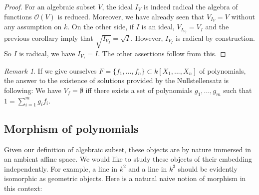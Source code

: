 \documentclass[12pt,a4paper,english]{article}
\theoremstyle{plain}
\theoremstyle{definition}
\theoremstyle{remark}
\newtheorem*{rem}{Remark}
\begin{document}
\begin{proof}
For an algebraic subset $V$, the ideal $I_{V}$ is indeed radical the algebra of functions $\mathcal{O}(V)$ is reduced. Moreover, we have already seen that $V_{I_{V}}=V$ without any assumption on $k$. On the other side, if $I$ is an ideal, $V_{I_{V_{I}}}=V_{I}$ and the previous corollary imply that $\sqrt{I_{V_{I}}}=\sqrt{I}$. However, $I_{V_{I}}$ is radical by construction. So $I$ is radical, we have $I_{V_{I}}=I$. The other assertions follow from this.  
\end{proof}
\begin{rem}
If we give ourselves $F=\{f_{1},...,f_{n}\}\subset k[X_{1},...,X_{n}]$ of polynomials, the answer to the existence of solutions provided by the Nullstellensatz is following: We have $V_{f}=\emptyset$ iff there exists a set of polynomials $g_{1},...,g_{m}$ such that $1=\sum^{m}_{i=1}g_{i}f_{i}$.
\end{rem}
\subsection{Morphism of polynomials}
Given our definition of algebraic subset, these objects are by nature immersed in an ambient affine space. We would like to study these objects of their embedding independently. For example, a line in $k^{2}$ and a line in $k^{3}$ should be evidently isomorphic as geometric objects. Here is a natural naive notion of morphism in this context:   
\end{document}
